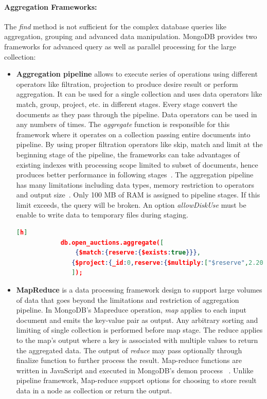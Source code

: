\paragraph{Aggregation Frameworks:}
 The \textit{find} method is not sufficient for the complex database queries like aggregation, grouping  and advanced data manipulation. MongoDB provides two frameworks for advanced query as well as parallel processing for the large collection:
 \begin{itemize}
		\item{ \textbf{Aggregation pipeline}} allows to execute series of operations using different operators like filtration, projection to produce desire result or perform aggregation.  It can be used for a single collection and uses  data operators like match, group, project, etc. in different stages. Every stage convert the documents as they pass through the pipeline. Data operators can be used  in any numbers of times.  The \textit{aggregate} function is responsible for this framework where it operates on a collection passing  entire documents into pipeline. By using proper filtration operators like  skip, match and limit at the beginning  stage of the pipeline,  the frameworks can take advantages of existing indexes with processing scope limited to subset of documents, hence produces better performance in following stages~\cite{mongodbaggregation}. The aggregation pipeline has many limitations including data types, memory restriction to operators and output size~\cite{nosql/comparision}. Only 100 MB of RAM is assigned to pipeline stages. If this limit exceeds, the query will be broken. An option \textit{allowDiskUse} must be enable to write data to temporary files during staging.
		
				   \begin{lstlisting}[language=JSON,caption=An example Aggregation pipeline in MongoDB, label=mongodb-aggregation-pipeline, basicstyle = \scriptsize][h]
            db.open_auctions.aggregate([
                {$match:{reserve:{$exists:true}}},
		       {$project:{_id:0,reserve:{$multiply:["$reserve",2.20371]}}}
		       ]);
		  \end{lstlisting}
		  
		  \item{\textbf{MapReduce}} is a data processing framework design to support large volumes of data that goes beyond the limitations and restriction of aggregation pipeline.  In MongoDB's Mapreduce operation,  \textit{map} applies to each input document and emits the key-value pair as output. Any arbitrary sorting and limiting  of single collection is performed before map stage. The reduce applies to the map's output where a key is associated with multiple values to return the aggregated data. The output of \textit{reduce} may pass optionally through finalize function to further process the result. Map-reduce functions are written in JavaScript and executed in MongoDB's demon process ~\cite{mongodbaggregation}.  Unlike pipeline framework, Map-reduce support options for choosing to store result  data in a node as collection or return the output. 
		  
\end{itemize}		

